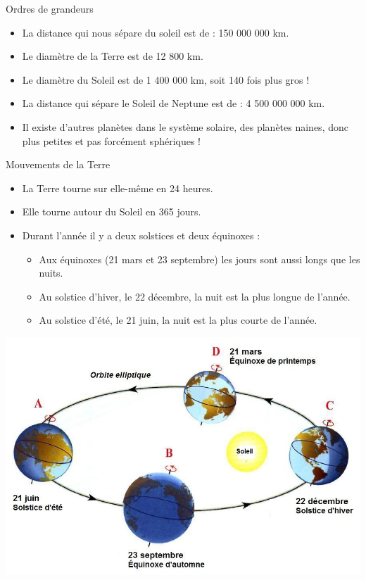 \documentclass[xcolor={dvipsnames}]{beamer}
\begin{document}
\begin{frame}
\begin{block}{Ordres de grandeurs}
	\begin{itemize}
		\item La distance qui nous sépare du soleil est de : 150 000 000 km.
		\item Le diamètre de la Terre est de 12 800 km.
		\item Le diamètre du Soleil est de 1 400 000 km, soit 140 fois plus gros !
		\item La distance qui sépare le Soleil de Neptune est de : 
		4 500 000 000 km.
		\item Il existe d’autres planètes dans le système solaire, des planètes naines, donc plus petites et pas forcément sphériques !
		
	\end{itemize}
\end{block}

\end{frame}


\begin{frame}

\begin{block}{Mouvements de la Terre }
	\begin{itemize}
		\item La Terre tourne sur elle-même en 24 heures.
		\item Elle tourne autour du Soleil en 365 jours.
		\item Durant l'année il y a deux solstices et deux équinoxes :
			\begin{itemize}
				\item Aux équinoxes (21 mars et 23 septembre) les jours sont aussi longs que les nuits.  
				\item Au solstice d'hiver, le 22 décembre, la nuit est la plus longue de l'année.
				\item Au solstice d'été, le 21 juin, la nuit est la plus courte de l'année.
			\end{itemize}
	\end{itemize}
\end{block}

	\begin{center}
		\includegraphics[scale=0.2]{solstices}
	\end{center}



\end{frame}
\end{document}

